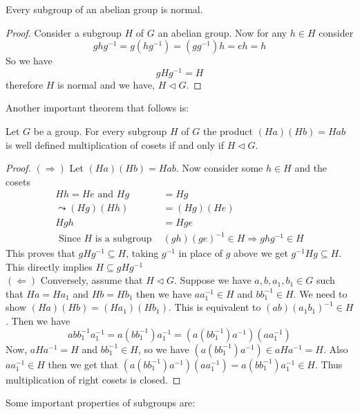 \documentclass[16pt,a4paper]{article}
\theoremstyle{definition}
\begin{document}
\begin{prop}{}{}
Every subgroup of an abelian group is normal. 
\end{prop}
\begin{proof}
Consider a subgroup $H$ of $G$ an abelian group. Now for any $h\in H$ consider 
\[ghg^{-1} = g(hg^{-1}) = (gg^{-1})h= eh = h\]
So we have 
\[gHg^{-1} = H\]
therefore $H$ is normal and we have, $H\lhd G$.  
\end{proof}
Another important theorem that follows is: 
\begin{thm}{}{}
Let $G$ be a group. For every subgroup $H$ of $G$ the product $(Ha)(Hb) = Hab$ is well defined multiplication of cosets if and only if $H\lhd G$. 
\end{thm}\label{well-def}
\begin{proof}
$(\Rightarrow)$ Let $(Ha)(Hb) = Hab$. Now consider some $h\in H$ and the cosets 
\begin{align*}
Hh = He \text{ and } Hg &= Hg\\
\leadsto (Hg)(Hh) &= (Hg)(He) \\
Hgh &= Hge \\
\text{ Since $H$ is a subgroup } &(gh)(ge)^{-1} \in H\Rightarrow ghg^{-1}\in H
\end{align*}
This proves that $gHg^{-1}\subseteq H$, taking $g^{-1}$ in place of $g$ above we get $g^{-1}Hg\subseteq H$. This directly implies $H\subseteq gHg^{-1}$
\\
$(\Leftarrow)$ Conversely, assume that $H\lhd G$. Suppose we have $a,b,a_1,b_1 \in G$ such that $Ha=Ha_1$ and $Hb=Hb_1$  then we have $aa_1^{-1} \in H $ and $bb_1^{-1}\in H$. We need to show $(Ha)(Hb)=(Ha_1)(Hb_1)$.  This is equivalent to $(ab)(a_1b_1)^{-1}\in H$. Then we have 
\[abb_1^{-1}a_1^{-1}=a(bb_1^{-1})a_1^{-1} = (a(bb_1^{-1})a^{-1})(aa_1^{-1})\]
Now, $aHa^{-1}=H$ and $bb_1^{-1}\in H $, so we have $(a(bb_1^{-1})a^{-1})\in aHa^{-1} = H$. Also $aa_1^{-1}\in H$ then we get that $(a(bb_1^{-1})a^{-1})(aa_1^{-1}) = a(bb_1^{-1})a_1^{-1}\in H$. Thus multiplication of right cosets is closed. 
\end{proof}

Some important properties of subgroups are: 
\end{document}
